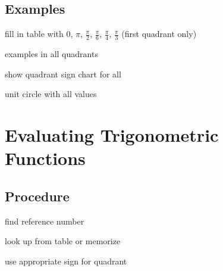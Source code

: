 \documentclass{exam}
\begin{document}
  \subsection{Examples}

  \begin{itemize*}
    \item fill in table with 0, $\pi$, $\frac{\pi}{2}$, $\frac{\pi}{6}$, $\frac{\pi}{4}$, $\frac{\pi}{3}$ (first
      quadrant only)
    \item examples in all quadrants
    \item show quadrant sign chart for all
    \item unit circle with all values
  \end{itemize*}

  \section{Evaluating Trigonometric Functions}

  \subsection{Procedure}
  \begin{itemize*}
    \item find reference number
    \item look up from table or memorize
    \item use appropriate sign for quadrant
  \end{itemize*}
\end{document}
